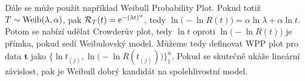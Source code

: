 Dále se může použít například Weibull Probability Plot. Pokud totiž $T\sim\mathrm{Weib}(\lambda,\alpha)$, pak $\mathcal{R}_T(t)=\mathrm{e}^{-(\lambda t)^\alpha}$, tedy $\ln\big(-\ln R(t)\big)=\alpha\ln\lambda+\alpha\ln t$. Potom se nabízí udělat Crowderův plot, tedy $\ln t$ oproti $\ln\big(-\ln R(t)\big)$ je přímka, pokud sedí Weibulovský model. Můžeme tedy definovat WPP plot pro data $\textbf{t}$ jako $\big\{\ln t_{(j)},\ln\big(-\ln \overline{R}(t_{(j)})\big)\}_1^n$. Pokud se skutečně ukáže lineární závislost, pak je Weibull dobrý kandidát na spolehlivostní model.

